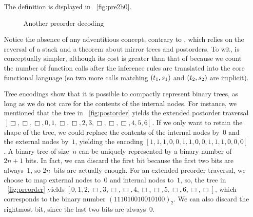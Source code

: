 The definition is displayed in
\fig~\vref{fig:pre2b0}.
\begin{figure}
\centering
{}
\caption{Another preorder decoding}
\label{fig:pre2b0}
\end{figure}
Notice the absence of any adventitious concept, contrary to
, which relies on the
reversal of a stack and a theorem about mirror
trees and postorders. To wit,
 is conceptually
simpler, although its cost is greater than that of
 because we count the number
of function calls after the inference rules
are translated into the core functional language (so two more calls
matching \(({t_1},{s_1})\) and \(({t_2},{s_2})\) are implicit).

Tree encodings show that it is possible to compactly represent binary
trees, as long as we do not care for the contents of the internal
nodes. For instance, we mentioned that the tree in
\fig~\vref{fig:postorder} yields the extended postorder traversal \([\Box, \Box, \Box, 0, 1, \Box,
  \Box, 2, 3, \Box, \Box, \Box, 4, 5, 6]\). If we only want to retain
the shape of the tree, we could replace the contents of the internal
nodes by~\(0\) and the external nodes by~\(1\), yielding the encoding
\([1,1,1,0,0,1,1,0,0,1,1,1,0,0,0]\). A binary tree of size~\(n\) can
be uniquely represented by a binary number of \(2n+1\) bits. In fact,
we can discard the first bit because the first two bits are
always~\(1\), so \(2n\)~bits are actually enough. For an extended
preorder traversal, we choose to map external nodes to~\(0\) and
internal nodes to~\(1\), so, the tree in \fig~\vref{fig:preorder}
yields \([0, 1, 2, \Box, 3, \Box, \Box, 4, \Box, \Box, 5, \Box, 6,
  \Box, \Box]\), which corresponds to the binary number
\((111010010010100)_2\). We can also discard the rightmost bit, since
the last two bits are always~\(0\).

